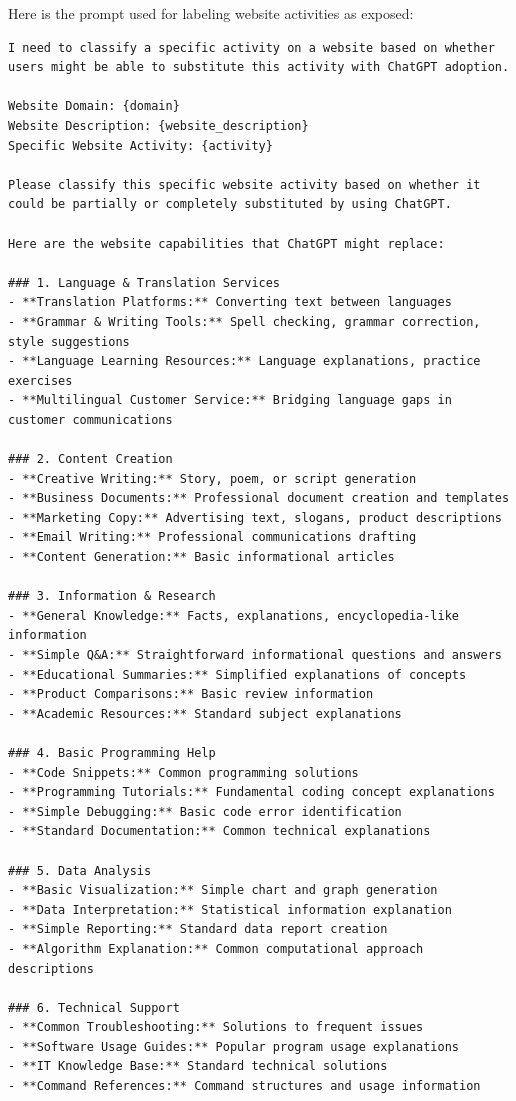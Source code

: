 \documentclass[12pt]{article}
\begin{document}
Here is the prompt used for labeling website activities as exposed:

\tiny
\begin{verbatim}
I need to classify a specific activity on a website based on whether users might be able to substitute this activity with ChatGPT adoption.

Website Domain: {domain}
Website Description: {website_description}
Specific Website Activity: {activity}

Please classify this specific website activity based on whether it could be partially or completely substituted by using ChatGPT.

Here are the website capabilities that ChatGPT might replace:

### 1. Language & Translation Services
- **Translation Platforms:** Converting text between languages
- **Grammar & Writing Tools:** Spell checking, grammar correction, style suggestions
- **Language Learning Resources:** Language explanations, practice exercises
- **Multilingual Customer Service:** Bridging language gaps in customer communications

### 2. Content Creation
- **Creative Writing:** Story, poem, or script generation
- **Business Documents:** Professional document creation and templates
- **Marketing Copy:** Advertising text, slogans, product descriptions
- **Email Writing:** Professional communications drafting
- **Content Generation:** Basic informational articles

### 3. Information & Research
- **General Knowledge:** Facts, explanations, encyclopedia-like information
- **Simple Q&A:** Straightforward informational questions and answers
- **Educational Summaries:** Simplified explanations of concepts
- **Product Comparisons:** Basic review information
- **Academic Resources:** Standard subject explanations

### 4. Basic Programming Help
- **Code Snippets:** Common programming solutions
- **Programming Tutorials:** Fundamental coding concept explanations
- **Simple Debugging:** Basic code error identification
- **Standard Documentation:** Common technical explanations

### 5. Data Analysis
- **Basic Visualization:** Simple chart and graph generation
- **Data Interpretation:** Statistical information explanation
- **Simple Reporting:** Standard data report creation
- **Algorithm Explanation:** Common computational approach descriptions

### 6. Technical Support
- **Common Troubleshooting:** Solutions to frequent issues
- **Software Usage Guides:** Popular program usage explanations
- **IT Knowledge Base:** Standard technical solutions
- **Command References:** Command structures and usage information


\end{verbatim}
\end{document}
